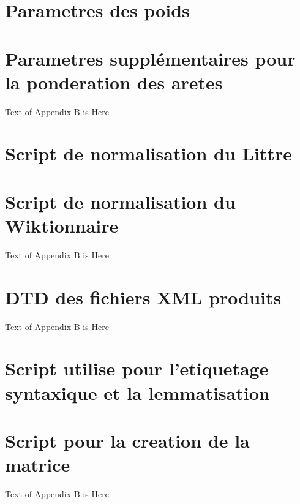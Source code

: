 \appendix
\section{Parametres des poids}\label{App:weights}
%

\section{Parametres supplémentaires pour la ponderation des aretes}\label{App:otherparams}
Text of Appendix B is Here

\section{Script de normalisation du Littre}\label{App:normlittre}
%

\section{Script de normalisation du Wiktionnaire}\label{App:normwiki}
Text of Appendix B is Here

\section{DTD des fichiers XML produits}\label{App:dtddico}
Text of Appendix B is Here

\section{Script utilise pour l'etiquetage syntaxique et la lemmatisation}\label{App:tag}
%

\section{Script pour la creation de la matrice}\label{App:creatematrix}
Text of Appendix B is Here
